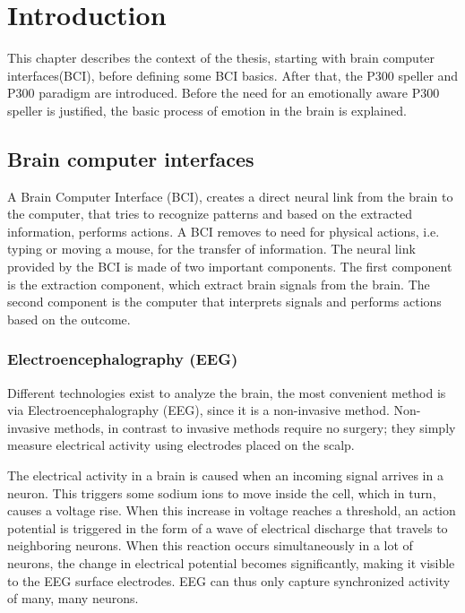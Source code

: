 \chapter{Introduction}
{\samenvatting This chapter describes the context of the thesis, starting with brain computer interfaces(BCI), before defining some BCI basics. After that, the P300 speller and P300 paradigm are introduced. Before the need for an emotionally aware P300 speller is justified, the basic process of emotion in the brain is explained. %
}


\section{Brain computer interfaces}

A Brain Computer Interface (BCI), creates a direct neural link from the brain to the computer\cite{LangModel}, that tries to recognize patterns and based on the extracted information, performs actions. A BCI removes to need for physical actions, i.e. typing or moving a mouse, for the transfer of information. The neural link provided by the BCI is made of two important components. The first component is the extraction component, which extract brain signals from the brain. The second component is the computer that interprets signals and performs actions based on the outcome.


\subsection{Electroencephalography (EEG)}
Different technologies exist to analyze the brain, the most convenient method is via Electroencephalography (EEG), since it is a non-invasive method. Non-invasive methods, in contrast to invasive methods require no surgery; they simply measure electrical activity using electrodes placed on the scalp.

\npar

The electrical activity in a brain is caused when an incoming signal arrives in a neuron. This triggers some sodium ions to move inside the cell, which in turn, causes a voltage rise\cite{ExtendedPaper}. When this increase in voltage reaches a threshold, an action potential is triggered in the form of a wave of electrical discharge that travels to neighboring neurons. When this reaction occurs simultaneously in a lot of neurons, the change in electrical potential becomes significantly, making it visible to the EEG surface electrodes. EEG can thus only capture synchronized activity of many, many neurons.

